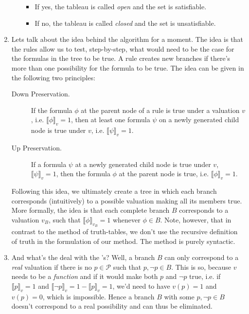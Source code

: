 \begin{enumerate}[\thesection.1]
\begin{enumerate}[1.]
\begin{itemize}
				\item If yes, the tableau is called \emph{open} and the set is satisfiable.
				
				\item If no, the tableau is called \emph{closed} and the set is unsatisfiable.
			
			\end{itemize}
		
		\end{enumerate}
		
		\item Lets talk about the idea behind the algorithm for a moment. The idea is that the rules allow us to test, step-by-step, what would need to be the case for the formulas in the tree to be true. A rule creates new branches if there's more than one possibility for the formula to be true. The idea can be given in the following two principles:
		
		\begin{description}
			
				\item[Down Preservation.] If the formula $\phi$ at the parent node of a rule is true under a valuation $v$, i.e. $\llbracket \phi\rrbracket_v=1$, then at least one formula $\psi$ on a newly generated child node is true under $v$, i.e. $\llbracket \psi\rrbracket_v=1$.
				
				\item[Up Preservation.] If a formula $\psi$ at a newly generated child node is true under $v$, $\llbracket \psi\rrbracket_v=1$, then the formula $\phi$ at the parent node is true, i.e. $\llbracket \phi\rrbracket_v=1$.
			
			\end{description}
		Following this idea, we ultimately create a tree in which each branch corresponds (intuitively) to a possible valuation making all its members true. More formally, the idea is that each complete branch $B$ corresponds to a valuation $v_B$, such that $\llbracket\phi\rrbracket_{v_B}=1$ whenever $\phi\in B$. Note, however, that in contrast to the method of truth-tables, we don't use the recursive definition of truth in the formulation of our method. The method is purely syntactic.
		
		
		\item And what's the deal with the {\xmark}'s? Well, a branch $B$ can only correspond to a \emph{real} valuation if there is no $p\in\mathcal{P}$ such that $p,\neg p\in B$. This is so, because $v$ needs to be a \emph{function} and if it would make both $p$ and $\neg p$ true, i.e. if $\llbracket p\rrbracket_v=1$ and $\llbracket \neg p\rrbracket_v=1-\llbracket p\rrbracket_v=1$, we'd need to have $v(p)=1$ and $v(p)=0$, which is impossible. Hence a branch $B$ with some $p,\neg p\in B$ doesn't correspond to a real possibility and can thus be eliminated. 
		

\end{enumerate}
